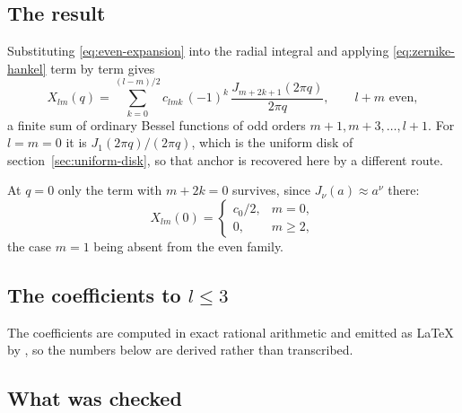 \subsection{The result}
\label{sec:even-result}

Substituting \eqref{eq:even-expansion} into the radial integral and applying
\eqref{eq:zernike-hankel} term by term gives
\begin{equation}
  X_{lm}(q) = \sum_{k=0}^{(l-m)/2} c_{lmk}\, (-1)^k\,
  \frac{J_{m+2k+1}(2\pi q)}{2\pi q} , \qquad l+m \text{ even} ,
  \label{eq:even-radial}
\end{equation}
a finite sum of ordinary Bessel functions of odd orders $m+1, m+3, \dots, l+1$.  For
$l = m = 0$ it is $J_1(2\pi q)/(2\pi q)$, which is the uniform disk of
section~\ref{sec:uniform-disk}, so that anchor is recovered here by a different
route.

At $q = 0$ only the term with $m+2k = 0$ survives, since $J_\nu(a) \approx a^\nu$
there:
\begin{equation}
  X_{lm}(0) = \begin{cases}
    c_0/2 , & m = 0 , \\[2pt]
    0 , & m \ge 2 ,
  \end{cases}
  \label{eq:even-limit}
\end{equation}
the case $m = 1$ being absent from the even family.

\subsection{The coefficients to \texorpdfstring{$l \le 3$}{l <= 3}}
\label{sec:even-table}

The coefficients are computed in exact rational arithmetic and emitted as LaTeX by
, so the numbers below are derived rather than transcribed.


\subsection{What was checked}
\label{sec:even-register}

